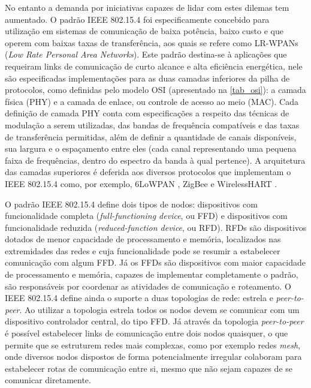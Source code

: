 \documentclass[
	12pt,				%
	openright,			%
	oneside,
	a4paper,			%
	english,			%
	french,				%
	spanish,			%
	brazil				%
	]{abntex2}
\begin{document}
No entanto a demanda por iniciativas capazes de lidar com estes dilemas tem aumentado. O padrão IEEE 802.15.4 \cite{IEEE2003} foi especificamente concebido para utilização em sistemas de comunicação de baixa potência, baixo custo e que operem com baixas taxas de transferência, aos quais se refere como LR-WPANs (\textit{Low Rate Personal Area Networks}). Este padrão destina-se à aplicações que requeiram links de comunicação de curto alcance e alta eficiência energética, nele são especificadas implementações para as duas camadas inferiores da pilha de protocolos, como definidas pelo modelo OSI (apresentado na \autoref{tab_osi}): a camada física (PHY) e a camada de enlace, ou controle de acesso ao meio (MAC). Cada definição de camada PHY conta com especificações a respeito das técnicas de modulação a serem utilizadas, das bandas de frequência compatíveis e das taxas de transferência permitidas, além de definir a quantidade de canais disponíveis, sua largura e o espaçamento entre eles (cada canal representando uma pequena faixa de frequências, dentro do espectro da banda à qual pertence). A arquitetura das camadas superiores é deferida aos diversos protocolos que implementam o IEEE 802.15.4 como, por exemplo, 6LoWPAN \cite{Montenegro2007}, ZigBee \cite{ZigBee2005} e WirelessHART \cite{Kim2008}.

O padrão IEEE 802.15.4 define dois tipos de nodos: dispositivos com funcionalidade completa (\textit{full-functioning device}, ou FFD) e dispositivos com funcionalidade reduzida (\textit{reduced-function device}, ou RFD). RFDs são dispositivos dotados de menor capacidade de processamento e memória, localizados nas extremidades das redes e cuja funcionalidade pode se resumir a estabelecer comunicação com algum FFD. Já os FFDs são dispositivos com maior capacidade de processamento e memória, capazes de implementar completamente o padrão, são responsáveis por coordenar as atividades de comunicação e roteamento. O IEEE 802.15.4 define ainda o suporte a duas topologias de rede: estrela e \textit{peer-to-peer}. Ao utilizar a topologia estrela todos os nodos devem se comunicar com um dispositivo controlador central, do tipo FFD. Já através da topologia \textit{peer-to-peer} é possível estabelecer links de comunicação entre dois nodos quaisquer, o que permite que se estruturem redes mais complexas, como por exemplo redes \textit{mesh}, onde diversos nodos dispostos de forma potencialmente irregular colaboram para estabelecer rotas de comunicação entre si, mesmo que não sejam capazes de se comunicar diretamente.
\end{document}
